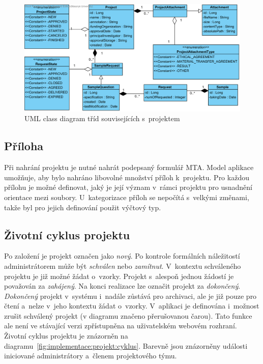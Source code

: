 \documentclass[11pt,draft,oneside]{fithesis2}
\begin{document}
\begin{figure}[h!]
\begin{center}
	\includegraphics[width=\textwidth]{ProjectView}
\caption{UML class diagram tříd souvisejících s~projektem}
\label{fig:index:uml:class:project}
\end{center}
\end{figure}

\subsection{Příloha}
Při nahrání projektu je nutné nahrát podepsaný formulář MTA. Model aplikace umožňuje, aby bylo nahráno libovolné množství příloh k~projektu. Pro každou přílohu je možné definovat, jaký je její význam v~rámci projektu pro usnadnění orientace mezi soubory. U~kategorizace příloh se nepočítá s~velkými změnami, takže byl pro jejich definování použit výčtový typ.

\subsection{Životní cyklus projektu}
Po založení je projekt označen jako \textit{nový}. Po kontrole formálních náležitostí administrátorem může být \textit{schválen} nebo \textit{zamítnut}. V~kontextu schváleného projektu je již možné žádat o~vzorky. Projekt s~alespoň jednou žádostí je považován za \textit{zahájený}. Na konci realizace lze označit projekt za \textit{dokončený}. \textit{Dokončený} projekt v~systému i~nadále zůstává pro archivaci, ale je již pouze pro čtení a~nelze v~jeho kontextu žádat o~vzorky. 
V~aplikaci je definována i~možnost zrušit schválený projekt (v diagramu značeno přerušovanou čarou). Tato funkce ale není ve stávající verzi zpřístupněna na uživatelském webovém rozhraní. Životní cyklus projektu je znázorněn na diagramu~\ref{fig:implementace:projekt:cyklus}. Barevně jsou znázorněny události iniciované {\color{palatinatepurple}administrátory} a~{\color{cyan}členem projektového týmu}. 
\end{document}
